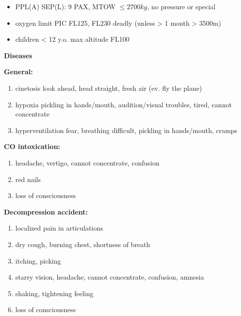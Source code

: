 \documentclass[12pt,a4paper,twoside]{article}
\newcommand{\BoxSpace}{\mbox{}\vspace{-8mm}}
\newcommand{\SkipPage}{\clearpage\BoxSpace}
\newcounter{SubCheck}
\newcommand*{\StepItem}{\stepcounter{enumi}}
\newcommand{\CheckSec}[1]{%
    \begin{flushleft}
    \noindent\textbf{\Large #1}%
    \end{flushleft}
    \vspace{-6mm}%
}%
\newcommand{\CheckSub}[1]{%
    \noindent\hspace{7mm}\textbf{#1:}%
    \vspace{-5mm}%
}%
\newcommand{\Check}[2]{%
    \StepItem
    \item[\arabic{enumi}.]
    #1%
    \dotfill%
    #2%
}
\renewcommand*{\leq}{\leqslant}
\newcommand*{\DocTitle}{}
\newcommand*{\SetTitle}[1]{%
    \renewcommand*{\DocTitle}{#1}%
}
\newenvironment{SubWrapper}[1]{%
    \vspace{-7mm}%
    \CheckSec{#1}%
}{%
    \vspace{-3mm}%
    \setcounter{SubCheck}{0}%
}%
\newenvironment{SubCheckList}[1]{%
    \CheckSub{#1}%
    \begin{enumerate}%
}{%
    \setcounter{SubCheck}{\value{enumi}}%
    \end{enumerate}%
}%
\begin{document}
\BoxSpace
\SetTitle{Pilot's own checks}%
%
\vspace{-7mm}
\begin{itemize}
    \item PPL(A) SEP(L): 9 PAX, MTOW $\leq 2700 kg$, no pressure or special
    \item oxygen limit PIC FL125, FL230 deadly (unless > 1 month > 3500m)
    \item children < 12 y.o. max altitude FL100
\end{itemize}
\vfill
\begin{SubWrapper}{Diseases}%
    \vspace{5mm}
\begin{SubCheckList}{General}{}%
    \Check{cinetosis}{look ahead, head straight, fresh air (ev. fly the plane)}
    \Check{hypoxia}{pickling in hands/mouth, audition/visual troubles, tired, cannot concentrate}
    \Check{hyperventilation}{fear, breathing difficult, pickling in hands/mouth, cramps}
\end{SubCheckList}%
\begin{SubCheckList}{CO intoxication}%
    \item headache, vertigo, cannot concentrate, confusion
    \item red nails
    \item loss of consciousness
\end{SubCheckList}%
\begin{SubCheckList}{Decompression accident}%
    \item localized pain in articulations
    \item dry cough, burning chest, shortness of breath
    \item itching, picking
    \item starry vision, headache, cannot concentrate, confusion, amnesia
    \item shaking, tightening feeling
    \item loss of consciousness
\end{SubCheckList}%
\end{SubWrapper}%
\SkipPage
%
\SetTitle{Flight with passengers}%
\end{document}
